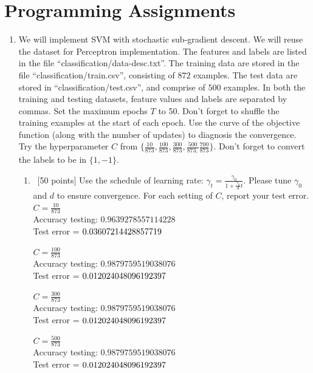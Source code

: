 \documentclass[12pt, fullpage,letterpaper]{article}
\begin{document}
\section{Programming Assignments}
\begin{enumerate}
\item We will implement  SVM with stochastic sub-gradient descent. We will reuse the dataset for Perceptron implementation. The features and labels are listed in the file ``classification/data-desc.txt''. The training data are stored in the file ``classification/train.csv'', consisting of $872$ examples. The test data are stored in ``classification/test.csv'', and comprise of $500$ examples. In both the training and testing datasets, feature values and labels are separated by commas. Set the maximum epochs $T$ to 50. Don't forget to shuffle the training examples at the start of each epoch. Use the curve of the objective function (along with the number of updates) to diagnosis the convergence. Try the hyperparameter $C$ from $\{\frac{10}{873}, \frac{100}{873}, \frac{300}{873}, \frac{500}{873,} \frac{700}{873}\}$. Don't forget to convert the labels to be in $\{1, -1\}$.  
\begin{enumerate}
\item~[50 points] Use the schedule of learning rate: $\gamma_t = \frac{\gamma_0}{1+\frac{\gamma_0}{d}t}$. Please tune $\gamma_0$ and $d$ to ensure convergence. For each setting of $C$, report your test error.\\

$C = \frac{10}{873}$\\
Accuracy testing: $0.9639278557114228$\\
Test error = $0.03607214428857719\\ $


$C = \frac{100}{873}$\\
Accuracy testing: $0.9879759519038076$\\
Test error = $0.012024048096192397\\ $


$C = \frac{300}{873}$\\
Accuracy testing: $0.9879759519038076$\\
Test error = $0.012024048096192397\\ $


$C = \frac{500}{873}$\\
Accuracy testing: $0.9879759519038076$\\
Test error = $0.012024048096192397\\ $



\end{enumerate}
\end{enumerate}
\end{document}
